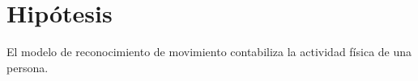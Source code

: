 \section{Hip\'otesis}
El modelo de reconocimiento de movimiento contabiliza la actividad f\'isica de una persona.